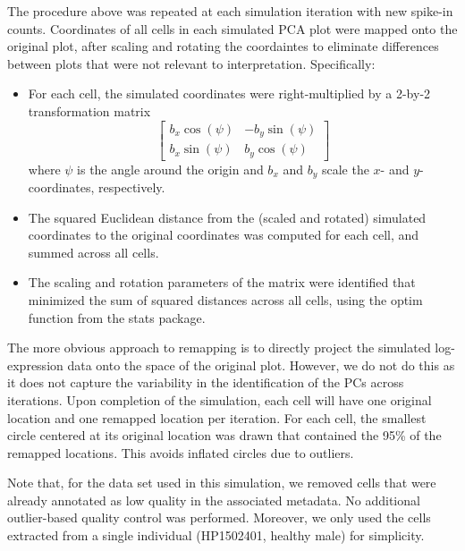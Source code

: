 \documentclass{article}
\begin{document}
The procedure above was repeated at each simulation iteration with new spike-in counts.
Coordinates of all cells in each simulated PCA plot were mapped onto the original plot, after scaling and rotating the coordaintes to eliminate differences between plots that were not relevant to interpretation.
Specifically:
\begin{itemize}
    \item For each cell, the simulated coordinates were right-multiplied by a 2-by-2 transformation matrix
        \[
            \left[\begin{array}{cc}
                    b_x \cos(\psi) & - b_y \sin(\psi) \\
                    b_x \sin(\psi) & b_y \cos(\psi) 
                \end{array}
            \right]
        \]
        where $\psi$ is the angle around the origin and $b_x$ and $b_y$ scale the $x$- and $y$-coordinates, respectively.
    \item The squared Euclidean distance from the (scaled and rotated) simulated coordinates to the original coordinates was computed for each cell, and summed across all cells.
    \item The scaling and rotation parameters of the matrix were identified that minimized the sum of squared distances across all cells, using the optim function from the stats package.
\end{itemize}
The more obvious approach to remapping is to directly project the simulated log-expression data onto the space of the original plot.
However, we do not do this as it does not capture the variability in the identification of the PCs across iterations.
Upon completion of the simulation, each cell will have one original location and one remapped location per iteration. 
For each cell, the smallest circle centered at its original location was drawn that contained the 95\% of the remapped locations.
This avoids inflated circles due to outliers.

Note that, for the data set used in this simulation, we removed cells that were already annotated as low quality in the associated metadata.
No additional outlier-based quality control was performed.
Moreover, we only used the cells extracted from a single individual (HP1502401, healthy male) for simplicity.

\printbibliography

\newpage
\end{document}
